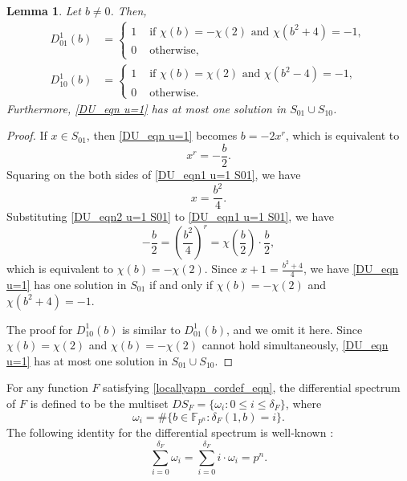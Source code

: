 \documentclass[11pt]{article}
\numberwithin{theorem}{section}
\newtheorem{lemma}[theorem]{Lemma}
\newcommand{\Fpn}{\mathbb{F}_{p^n}}
\begin{document}
\begin{lemma}\label{DU_lemma u=1 chi(x)!=chi(x+1)}
	Let $b\ne 0$. Then, 
	\begin{align*}
		D_{01}^1(b)&=
		\begin{cases}
			1 &\text{ if }\chi(b)=-\chi(2)\text{ and }\chi\left( b^2+4\right) =-1,\\
			0 &\text{ otherwise,}
		\end{cases}
		\\ 
		D_{10}^1(b)&=
		\begin{cases}
			1 &\text{ if }\chi(b)=\chi(2)\text{ and }\chi\left( b^2-4 \right) =-1,\\
			0 &\text{ otherwise.}
		\end{cases}
	\end{align*}
	Furthermore, \eqref{DU_eqn u=1} has at most one solution in $S_{01}\cup S_{10}$.
\end{lemma}
\begin{proof}
	If $x\in S_{01}$, then \eqref{DU_eqn u=1} becomes $b=-2x^r$, which is equivalent to  
	\begin{equation}\label{DU_eqn1 u=1 S01}
		x^r=-\frac{b}{2}.
	\end{equation}
	Squaring on the both sides of \eqref{DU_eqn1 u=1 S01}, we have
	\begin{equation}\label{DU_eqn2 u=1 S01}
		x=\frac{b^2}{4}.
	\end{equation}
	Substituting \eqref{DU_eqn2 u=1 S01} to \eqref{DU_eqn1 u=1 S01}, we have
	\begin{equation*}
		-\frac{b}{2}=\left( \frac{b^2}{4} \right)^r = \chi\left( \frac{b}{2}\right) \cdot \frac{b}{2},
	\end{equation*}
	which is equivalent to $\chi(b)=-\chi(2)$. Since $x+1=\frac{b^2+4}{4}$, we have \eqref{DU_eqn u=1} has one solution in $S_{01}$ if and only if $\chi(b)=-\chi(2)$ and $\chi(b^2+4)=-1$.
	
	The proof for $D_{10}^1(b)$ is similar to $D_{01}^1(b)$, and we omit it here. Since $\chi(b)=\chi(2)$ and $\chi(b)=-\chi(2)$ cannot hold simultaneously, \eqref{DU_eqn u=1} has at most one solution in $S_{01}\cup S_{10}$.
\end{proof}


For any function $F$ satisfying \eqref{locallyapn_cordef_eqn}, the differential spectrum of $F$ is defined to be the multiset $DS_F = \{\omega_i : 0\le i \le \delta_F\}$, where
\begin{equation*}
	\omega_i = \#\{b\in \Fpn : \delta_F(1,b)=i\}. 
\end{equation*} 
The following identity for the differential spectrum is well-known :
\begin{equation}\label{DS_identity}
	\sum_{i=0}^{\delta_F}\omega_i = \sum_{i=0}^{\delta_F}i\cdot \omega_i = p^n.
\end{equation}
\end{document}

